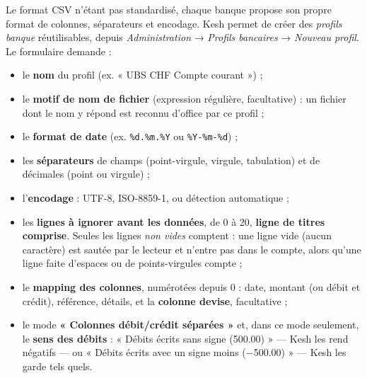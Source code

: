 \documentclass[a4paper,11pt,oneside]{article}
\begin{document}
Le format CSV n'étant pas standardisé, chaque banque propose son propre format de colonnes, séparateurs et encodage. Kesh permet de créer des \emph{profils banque} réutilisables, depuis \emph{Administration} → \emph{Profils bancaires} → \emph{Nouveau profil}. Le formulaire demande :

\begin{itemize}
    \item le \textbf{nom} du profil (ex. « UBS CHF Compte courant ») ;
    \item le \textbf{motif de nom de fichier} (expression régulière, facultative) : un fichier dont le nom y répond est reconnu d'office par ce profil ;
    \item le \textbf{format de date} (ex. \texttt{\%d.\%m.\%Y} ou \texttt{\%Y-\%m-\%d}) ;
    \item les \textbf{séparateurs} de champs (point-virgule, virgule, tabulation) et de décimales (point ou virgule) ;
    \item l'\textbf{encodage} : UTF-8, ISO-8859-1, ou détection automatique ;
    \item les \textbf{lignes à ignorer avant les données}, de 0 à 20, \textbf{ligne de titres comprise}. Seules les lignes \emph{non vides} comptent : une ligne vide (aucun caractère) est sautée par le lecteur et n'entre pas dans le compte, alors qu'une ligne faite d'espaces ou de points-virgules compte ;
    \item le \textbf{mapping des colonnes}, numérotées depuis 0 : date, montant (ou débit et crédit), référence, détails, et la \textbf{colonne devise}, facultative ;
    \item le mode \textbf{« Colonnes débit/crédit séparées »} et, dans ce mode seulement, le \textbf{sens des débits} : « Débits écrits sans signe (500.00) » — Kesh les rend négatifs — ou « Débits écrits avec un signe moins (−500.00) » — Kesh les garde tels quels.
\end{itemize}
\end{document}
